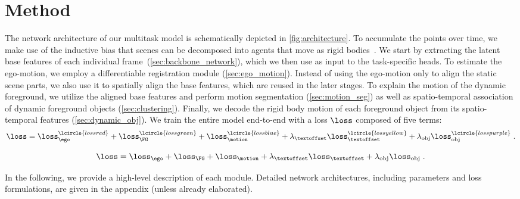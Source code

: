 \section{Method}
\label{sec:method}


The network architecture of our multitask model is schematically depicted in \cref{fig:architecture}. To accumulate the points over time, we make use of the inductive bias that scenes can be decomposed into agents that move as rigid bodies~\cite{gojcic2021weakly}. We start by extracting the latent base features of each individual frame~(\cref{sec:backbone_network}), which we then use as input to the task-specific heads. To estimate the ego-motion, we employ a differentiable registration module (\cref{sec:ego_motion}). Instead of using the ego-motion only to align the static scene parts, we also use it to spatially align the base features, which are reused in the later stages. To explain the motion of the dynamic foreground, we utilize the aligned base features and perform motion segmentation (\cref{sec:motion_seg}) as well as spatio-temporal association of dynamic foreground objects (\cref{sec:clustering}). Finally, we decode the rigid body motion of each foreground object from its spatio-temporal features (\cref{sec:dynamic_obj}). We train the entire model end-to-end with a loss $\loss$ composed of five terms: 
\begin{equation}
    \loss = \loss_\ego^\lcircle{lossred} + \loss_\FG^\lcircle{lossgreen} + \loss_\motion^\lcircle{lossblue} + \lambda_\textoffset\loss_\textoffset^\lcircle{lossyellow} + \lambda_{\text{obj}}\loss_{\text{obj}}^\lcircle{losspurple}\;.
    \label{eq:loss}
\end{equation}

\begin{equation}
    \loss = \loss_\ego + \loss_\FG + \loss_\motion + \lambda_\textoffset\loss_\textoffset + \lambda_{\text{obj}}\loss_{\text{obj}}\;.
\end{equation}

In the following, we provide a high-level description of each module. 
Detailed network architectures, including parameters and loss formulations, are given in the appendix (unless already elaborated).

